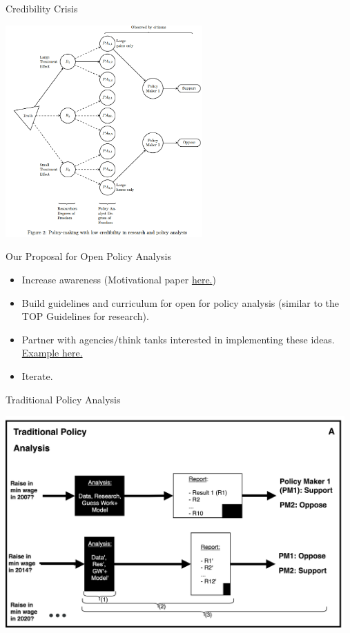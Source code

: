 \documentclass[ignorenonframetext,]{beamer}
\begin{document}
\begin{frame}{Credibility Crisis}
\protect\hypertarget{credibility-crisis}{}

\centering

\includegraphics[height=3.2in]{../Images/fig2.png}

\end{frame}

\begin{frame}{Our Proposal for Open Policy Analysis}
\protect\hypertarget{our-proposal-for-open-policy-analysis}{}

\begin{itemize}
\item
  Increase awareness (Motivational paper
  \href{https://osf.io/preprints/bitss/jnyqh}{here.})
\item
  Build guidelines and curriculum for open for policy analysis (similar
  to the TOP Guidelines for research).
\item
  Partner with agencies/think tanks interested in implementing these
  ideas. \href{https://rpubs.com/fhoces/dd_cbo_mw}{Example here.}
\item
  Iterate.
\end{itemize}

\end{frame}

\begin{frame}{Traditional Policy Analysis}
\protect\hypertarget{traditional-policy-analysis}{}

\centering

\includegraphics[height=3.2in]{../Images/traditional.png}

\end{frame}
\end{document}
